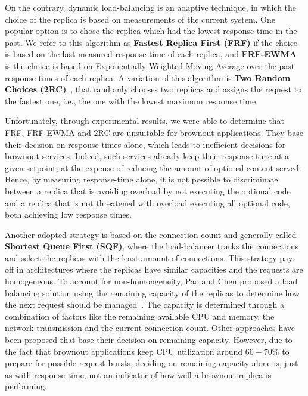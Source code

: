 On the contrary, dynamic load-balancing is an adaptive technique, in
which the choice of the replica is based on measurements of the
current system.  One popular option is to chose the replica which had
the lowest response time in the past.  We refer to this algorithm as
\textbf{Fastest Replica First (FRF)} if the choice is based on the
last measured response time of each replica, and \textbf{FRF-EWMA} is
the choice is based on Exponentially Weighted Moving Average over the
past response times of each replica.  A variation of this algorithm is
\textbf{Two Random Choices (2RC)}~\cite{2RC}, that randomly chooses
two replicas and assigns the request to the fastest one, i.e., the one
with the lowest maximum response time.

Unfortunately, through experimental results, we were able to determine
that FRF, FRF-EWMA and 2RC are unsuitable for brownout
applications. They base their decision on response times alone, which
leads to inefficient decisions for brownout services. Indeed, such
services already keep their response-time at a given setpoint, at the
expense of reducing the amount of optional content served. Hence, by
measuring response-time alone, it is not possible to discriminate
between a replica that is avoiding overload by not executing the
optional code and a replica that is not threatened with overload
executing all optional code, both achieving low response times.

Another adopted strategy is based on the connection count and
generally called \textbf{Shortest Queue First (SQF)}, where the
load-balancer tracks the connections and select the replicas with the
least amount of connections. This strategy pays off in architectures
where the replicas have similar capacities and the requests are
homogeneous. To account for non-homongeneity, Pao and Chen proposed a
load balancing solution using the remaining capacity of the replicas
to determine how the next request should be
managed~\cite{feedbackintensive}. The capacity is determined through a
combination of factors like the remaining available CPU and memory,
the network transmission and the current connection count.  Other
approaches have been proposed that base their decision on remaining
capacity. However, due to the fact that brownout applications keep CPU
utilization around $60-70\%$ to prepare for possible request bursts,
deciding on remaining capacity alone is, just as with response time,
not an indicator of how well a brownout replica is performing.


